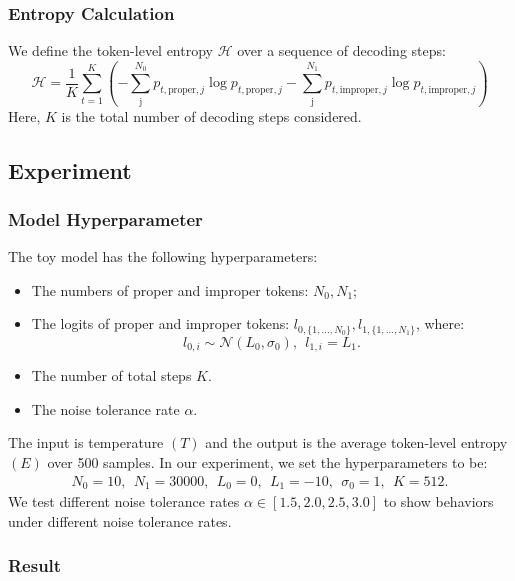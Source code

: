 \subsubsection{Entropy Calculation}

We define the token-level entropy \(\mathcal{H}\) over a sequence of decoding steps:
\[
\mathcal{H} = \frac{1}{K} \sum_{t=1}^{K} \left( -\sum_{\text{j}}^{N_0} p_{t,\text{proper}, j} \log p_{t,\text{proper}, j} -\sum_{\text{j}}^{N_1} p_{t,\text{improper}, j} \log p_{t,\text{improper}, j} \right)\]
Here, $K$ is the total number of decoding steps considered.

\subsection{Experiment}

\subsubsection{Model Hyperparameter}

The toy model has the following hyperparameters:
\begin{itemize}
    \item The numbers of proper and improper tokens: $N_0, N_1$;
    \item The logits of proper and improper tokens: $l_{0,\{1, ..., N_0\}}, l_{1,\{1, ..., N_1\}}$, where:
\[l_{0, i} \sim \mathcal{N}(L_0, \sigma_0), \ \ l_{1, i} = L_1.\]
    \item The number of total steps $K$.
    \item The noise tolerance rate $\alpha$.
\end{itemize}
The input is temperature $(T)$ and the output is the average token-level entropy $(E)$ over 500 samples.
In our experiment, we set the hyperparameters to be:
\begin{align*}
N_0=10, \ \ N_1 = 30000, \ \ L_0 = 0,\ \  L_1 = -10,\ \ \sigma_0 = 1,\ \ K=512.
\end{align*}
We test different noise tolerance rates $\alpha \in [1.5, 2.0, 2.5, 3.0]$ to show behaviors under different noise tolerance rates.

\subsubsection{Result}

